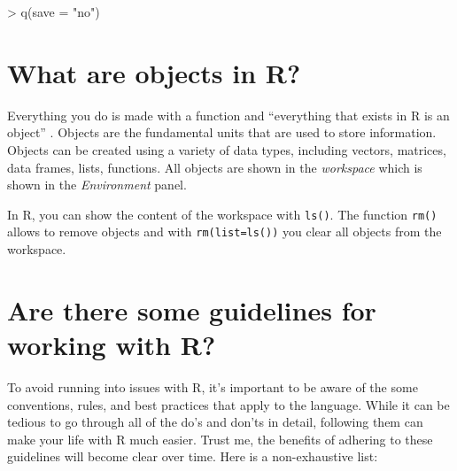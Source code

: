 \documentclass[
  12pt,
  oneside]{book}
\newenvironment{Shaded}{\begin{snugshade}}{\end{snugshade}}
\newcommand{\NormalTok}[1]{#1}
\theoremstyle{definition}
\theoremstyle{definition}
\theoremstyle{definition}
\theoremstyle{definition}
\theoremstyle{remark}
\begin{document}
\begin{Shaded}
\begin{Highlighting}[]
\NormalTok{\textgreater{} q(save = "no")}
\end{Highlighting}
\end{Shaded}

\hypertarget{sec:objects}{%
\section{What are objects in R?}\label{sec:objects}}

Everything you do is made with a function and ``everything that exists in R is an object'' \citep[p.~4]{Chambers2017Extending}. Objects are the fundamental units that are used to store information. Objects can be created using a variety of data types, including vectors, matrices, data frames, lists, functions. All objects are shown in the \emph{workspace} which is shown in the \emph{Environment} panel.

In R, you can show the content of the workspace with \texttt{ls()}. The function \texttt{rm()} allows to remove objects and with \texttt{rm(list=ls())} you clear all objects from the workspace.

\hypertarget{are-there-some-guidelines-for-working-with-r}{%
\section{Are there some guidelines for working with R?}\label{are-there-some-guidelines-for-working-with-r}}

To avoid running into issues with R, it's important to be aware of the some conventions, rules, and best practices that apply to the language. While it can be tedious to go through all of the do's and don'ts in detail, following them can make your life with R much easier. Trust me, the benefits of adhering to these guidelines will become clear over time. Here is a non-exhaustive list:
\end{document}
